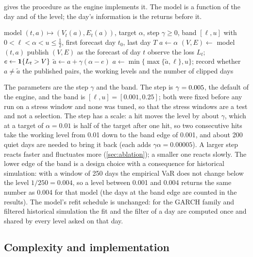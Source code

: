  gives the procedure as the engine implements it. The model is a function of the day and of the level; the day's information is the returns before it.

\begin{algorithm}[htbp]
\caption{Adaptive conformal wrapper of a VaR and ES model.}
\label{alg:wrapper}
\begin{algorithmic}[1]
\Require model $(t, a) \mapsto (V_t(a), E_t(a))$, target $\alpha$, step $\gamma \ge 0$, band $[\ell, u]$ with $0 < \ell < \alpha < u \le \tfrac12$, first forecast day $t_0$, last day $T$
\State $a \gets \alpha$
  \State $(V, E) \gets$ model$(t, a)$ 
  \State publish $(V, E)$ as the forecast of day $t$
  \State observe the loss $L_t$; $e \gets \mathbf{1}\{L_t > V\}$
  \State $\tilde a \gets a + \gamma(\alpha - e)$
  \State $a \gets \min\{\max\{\tilde a, \ell\}, u\}$; record whether $a \ne \tilde a$ 
\EndFor
\State \Return the published pairs, the working levels and the number of clipped days
\end{algorithmic}
\end{algorithm}

The parameters are the step $\gamma$ and the band. The step is $\gamma = 0.005$, the default of the engine, and the band is $[\ell, u] = [0.001, 0.25]$; both were fixed before any run on a stress window and none was tuned, so that the stress windows are a test and not a selection. The step has a scale: a hit moves the level by about $\gamma$, which at a target of $\alpha = 0.01$ is half of the target after one hit, so two consecutive hits take the working level from 0.01 down to the band edge of 0.001, and about 200 quiet days are needed to bring it back (each adds $\gamma\alpha = 0.00005$). A larger step reacts faster and fluctuates more (\cref{sec:ablation}); a smaller one reacts slowly. The lower edge of the band is a design choice with a consequence for historical simulation: with a window of 250 days the empirical VaR does not change below the level $1/250 = 0.004$, so a level between 0.001 and 0.004 returns the same number as 0.004 for that model (the days at the band edge are counted in the results). The model's refit schedule is unchanged: for the GARCH family and filtered historical simulation the fit and the filter of a day are computed once and shared by every level asked on that day.

\subsection{Complexity and implementation}
\label{sec:method-implementation}

